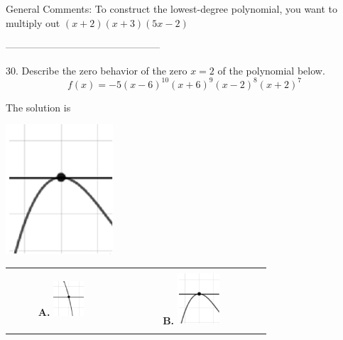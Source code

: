 \documentclass{article}[14pt]
\begin{document}
General Comments: To construct the lowest-degree polynomial, you want to multiply out $(x + 2)(x + 3)(5x -2)$

-----------------------------------------------

30. Describe the zero behavior of the zero $x = 2$ of the polynomial below.
$$ f(x) = -5(x - 6)^{10}(x + 6)^{9}(x - 2)^{8}(x + 2)^{7} $$ 

 
 The solution is  
 \begin{center} \includegraphics[width=0.3\textwidth]{../Figures/zeroBehaviorNegativeEvenA.png} \end{center}\begin{tabular}{|c|c|} 
\hline 
 & \tabularnewline 
 \textbf{A.} \includegraphics[width=0.3\textwidth]{../Figures/zeroBehaviorNegativeOddA.png} & \textbf{B.} \includegraphics[width=0.3\textwidth]{../Figures/zeroBehaviorNegativeEvenA.png} \tabularnewline 
\hline 
 & \tabularnewline 

\end{tabular}
\end{document}
